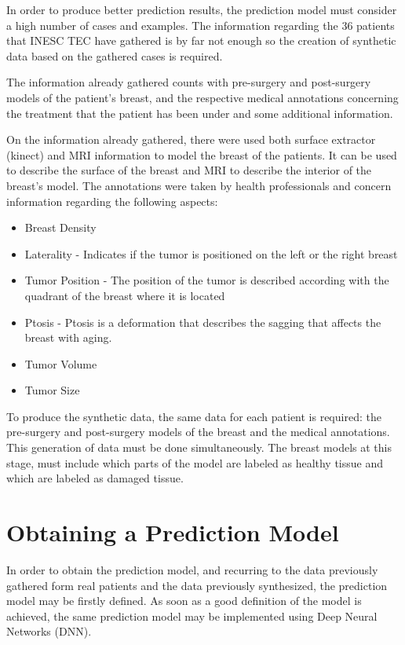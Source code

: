 In order to produce better prediction results, the prediction model must consider a high number of cases and examples. The information regarding the 36 patients that INESC TEC have gathered is by far not enough so the creation of synthetic data based on the gathered cases is required.

The information already gathered counts with pre-surgery and post-surgery models of the patient's breast, and the respective medical annotations concerning the treatment that the patient has been under and some additional information.

On the information already gathered, there were used both surface extractor (kinect) and MRI information to model the breast of the patients. It can be used to describe the surface of the breast and MRI to describe the interior of the breast's model. The annotations were taken by health professionals and concern information regarding the following aspects:

\begin{itemize}
\item Breast Density
\item Laterality - Indicates if the tumor is positioned on the left or the right breast
\item Tumor Position - The position of the tumor is described according with the quadrant of the breast where it is located
\item Ptosis - Ptosis is a deformation that describes the sagging that affects the breast with aging.
\item Tumor Volume
\item Tumor Size
\end{itemize}

To produce the synthetic data, the same data for each patient is required: the pre-surgery and post-surgery models of the breast and the medical annotations. This generation of data must be done simultaneously. The breast models at this stage, must include which parts of the model are labeled as healthy tissue and which are labeled as damaged tissue.

\section{Obtaining a Prediction Model}
In order to obtain the prediction model, and recurring to the data previously gathered form real patients and the data previously synthesized, the prediction model may be firstly defined. As soon as a good definition of the model is achieved, the same prediction model may be implemented using Deep Neural Networks (DNN).

